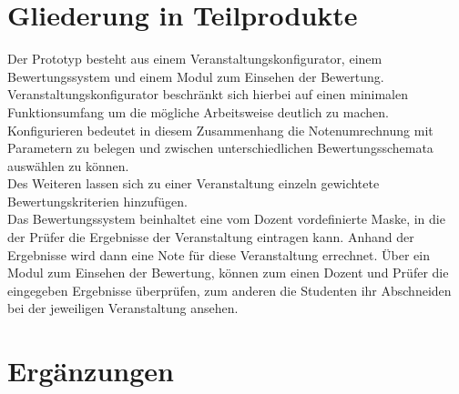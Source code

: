 	\section{Gliederung in Teilprodukte}
	Der Prototyp besteht aus einem  Veranstaltungskonfigurator, einem Bewertungssystem und einem Modul zum Einsehen der Bewertung.\\
	Veranstaltungskonfigurator beschränkt sich hierbei auf einen minimalen Funktionsumfang um die mögliche Arbeitsweise deutlich zu machen.\\ 
	Konfigurieren bedeutet in diesem Zusammenhang die Notenumrechnung mit Parametern zu belegen und zwischen unterschiedlichen Bewertungsschemata auswählen zu können.\\ 
	Des Weiteren lassen sich zu einer Veranstaltung einzeln gewichtete Bewertungskriterien hinzufügen.\\ 
	Das Bewertungssystem beinhaltet eine vom Dozent vordefinierte Maske, in die der Prüfer die Ergebnisse der Veranstaltung eintragen kann. Anhand der Ergebnisse wird dann eine Note für diese Veranstaltung errechnet.
	Über ein Modul zum Einsehen der Bewertung, können zum einen Dozent und Prüfer die eingegeben Ergebnisse überprüfen, zum anderen die Studenten ihr Abschneiden bei der jeweiligen Veranstaltung ansehen.
		
	
	\section{Ergänzungen}
		
	
	
